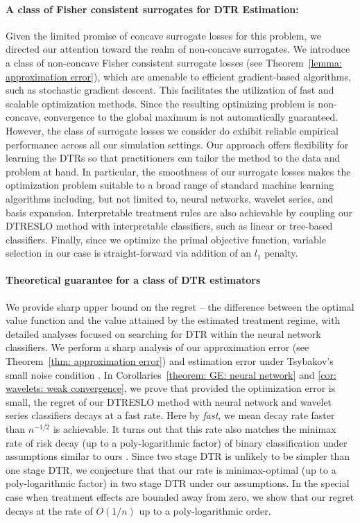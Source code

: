 \documentclass[preprint] {imsart}
\begin{document}
  \paragraph{A class of Fisher consistent surrogates for DTR Estimation:}{
  Given the limited promise of concave surrogate losses for this problem, we directed our attention toward the realm of non-concave surrogates. We introduce a class of non-concave Fisher consistent surrogate losses (see Theorem~\ref{lemma: approximation error}), which are amenable to efficient gradient-based algorithms, such as stochastic gradient descent. This facilitates the utilization of fast and scalable optimization methods. {\color{black} {Since}\label{non-concave 1} the resulting optimizing problem is non-concave, convergence to the global maximum is not automatically guaranteed. However, the class of surrogate losses we consider do exhibit reliable empirical performance across all our simulation settings. } 
  Our approach offers flexibility for learning the DTRs so that practitioners can tailor the method to the data and problem at hand. 
 In particular, the smoothness of our surrogate losses makes the optimization problem suitable to a broad range of standard machine learning algorithms including, but not limited to, neural networks, wavelet series, and basis expansion. Interpretable treatment rules are also achievable by coupling our DTRESLO method with interpretable classifiers, such as linear or tree-based classifiers.
 Finally, since we optimize the primal objective function, variable selection in our case is straight-forward via addition of an $l_1$ penalty. 
  }
 
 \paragraph{Theoretical guarantee for a class of DTR estimators} We provide sharp upper bound on the regret -- the difference between the optimal value function and the value attained by  the estimated treatment regime, with detailed analyses focused on searching for DTR within the neural network classifiers. We perform a sharp analysis of our approximation error (see Theorem~\ref{thm: approximation error}) and  estimation  error  under Tsybakov's small noise condition  \citep{tsybakov2004}.
 In Corollaries~\ref{theorem: GE: neural network} and \ref{cor: wavelets: weak convergence}, we prove that provided the optimization error is small, the regret of our DTRESLO method with neural network and wavelet series classifiers decays at a fast rate. Here by \textit{fast}, we mean  decay rate faster than $n^{-1/2}$ is achievable. It turns out that this rate also matches 
 the minimax rate of risk decay (up to a poly-logarithmic factor) of binary classification  under  assumptions similar to ours \citep{audibert2007}.
  Since two stage DTR is unlikely to be simpler than one stage DTR, we conjecture that that our rate is   minimax-optimal (up to a poly-logarithmic factor) in two stage DTR under our assumptions. 
In the special case when treatment effects are bounded away from zero, we show that our regret decays at the rate of $O(1/n)$ up to a poly-logarithmic order. 
\end{document}
